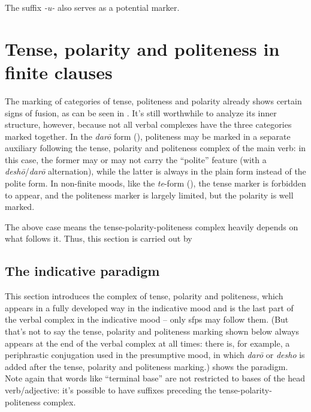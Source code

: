 \documentclass[UTF8, a4paper, oneside, scheme=plain]{ctexrep}
\newcommand{\corpus}[1]{\emph{#1}}
\begin{document}
The suffix \corpus{-u-} also serves as a potential marker.

\section{Tense, polarity and politeness in finite clauses}\label{sec:tense-polarity-polite}

The marking of categories of tense, politeness and polarity 
already shows certain signs of fusion,
as can be seen in .
It's still worthwhile to analyze its inner structure, however,
because not all verbal complexes have the three categories marked together.
In the \corpus{dar\={o}} form (),
politeness may be marked in a separate auxiliary following 
the tense, polarity and politeness complex of the main verb:
in this case, the former may or may not carry the ``polite'' feature
(with a \corpus{desh\={o}}/\corpus{dar\={o}} alternation),
while the latter is always in the plain form instead of the polite form.
In non-finite moods, like the \corpus{te}-form (), 
the tense marker is forbidden to appear,
and the politeness marker is largely limited,
but the polarity is well marked.

The above case means the tense-polarity-politeness complex heavily depends on what follows it.
Thus, this section is carried out by 

\subsection{The indicative paradigm}\label{sec:indicative-paradigm}

This section introduces the complex of tense, polarity and politeness,
which appears in a fully developed way in the indicative mood
and is the last part of the verbal complex in the indicative mood
-- only \ac{sfp}s may follow them.
(But that's not to say the tense, polarity and politeness marking shown below
always appears at the end of the verbal complex at all times:
there is, for example, a periphrastic conjugation used in the presumptive mood, 
in which \corpus{dar\={o}} or \corpus{desho} is added after the tense, polarity and politeness marking.)
 shows the paradigm. 
Note again that words like ``terminal base'' are not restricted to bases of the head verb/adjective:
it's possible to have suffixes preceding the tense-polarity-politeness complex.
\end{document}
